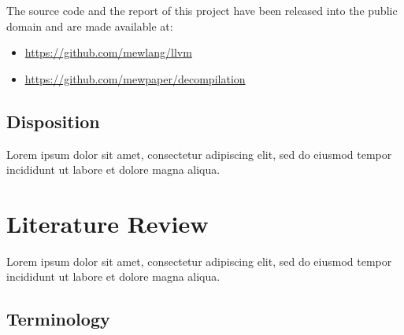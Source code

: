 \documentclass[12pt, a4paper]{article}
\begin{document}
The source code and the report of this project have been released into the public domain \cite{cc0} and are made available at:
\begin{itemize}
	\item \url{https://github.com/mewlang/llvm}
	\item \url{https://github.com/mewpaper/decompilation}
\end{itemize}

%
%


\subsection{Disposition}

Lorem ipsum dolor sit amet, consectetur adipiscing elit, sed do eiusmod tempor incididunt ut labore et dolore magna aliqua.



\section{Literature Review}

Lorem ipsum dolor sit amet, consectetur adipiscing elit, sed do eiusmod tempor incididunt ut labore et dolore magna aliqua.


\subsection{Terminology}
\end{document}
